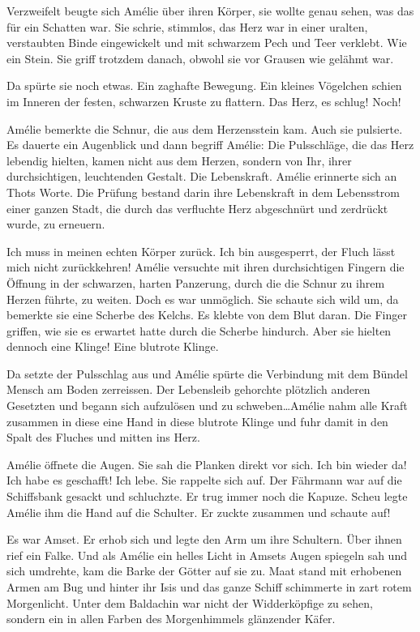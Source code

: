 \documentclass[11pt,titlepage,a5paper]{book}
\begin{document}
Verzweifelt beugte sich Amélie über ihren Körper, sie wollte genau sehen, was das für ein Schatten war. Sie schrie, stimmlos, das Herz war in einer uralten, verstaubten Binde eingewickelt und mit schwarzem Pech und Teer verklebt. Wie ein Stein. Sie griff trotzdem danach, obwohl sie vor Grausen wie gelähmt war. 

Da spürte sie noch etwas. Ein zaghafte Bewegung. Ein kleines Vögelchen schien  im Inneren der festen, schwarzen Kruste zu flattern. Das Herz, es schlug! Noch!

Amélie bemerkte die Schnur, die aus dem Herzensstein kam. Auch sie pulsierte. Es dauerte ein Augenblick und dann begriff Amélie: Die Pulsschläge, die das Herz lebendig hielten, kamen nicht aus dem Herzen, sondern von Ihr, ihrer durchsichtigen, leuchtenden Gestalt. Die Lebenskraft.  Amélie erinnerte sich an Thots Worte. Die Prüfung bestand darin ihre Lebenskraft in dem Lebensstrom einer ganzen Stadt, die durch das verfluchte Herz abgeschnürt und zerdrückt wurde, zu erneuern.

Ich muss in meinen echten Körper zurück. Ich bin ausgesperrt, der Fluch lässt mich nicht zurückkehren! Amélie versuchte mit ihren durchsichtigen Fingern die Öffnung in der schwarzen, harten Panzerung, durch die die Schnur zu ihrem Herzen führte, zu weiten. Doch es war unmöglich. Sie schaute sich wild um, da bemerkte sie eine Scherbe des Kelchs. Es klebte von dem Blut daran. Die Finger griffen, wie sie es erwartet hatte durch die Scherbe hindurch. Aber sie hielten dennoch eine Klinge! Eine blutrote Klinge. 

Da setzte der Pulsschlag aus und Amélie spürte die Verbindung mit dem Bündel Mensch am Boden zerreissen. Der Lebensleib gehorchte plötzlich anderen Gesetzten und begann sich aufzulösen und zu schweben\dots Amélie nahm alle Kraft zusammen in diese eine Hand in diese blutrote Klinge und fuhr damit in den Spalt des Fluches und mitten ins Herz.

Amélie öffnete die Augen. Sie sah die Planken direkt vor sich. Ich bin wieder da! Ich habe es geschafft! Ich lebe. Sie rappelte sich auf. Der Fährmann war auf die Schiffsbank gesackt und schluchzte. Er trug immer noch die Kapuze. Scheu legte Amélie ihm die Hand auf die Schulter. Er zuckte zusammen und schaute auf! 

Es war Amset. Er erhob sich und legte den Arm um ihre Schultern. Über ihnen rief ein Falke. Und als Amélie ein helles Licht in Amsets Augen spiegeln sah und sich umdrehte, kam die Barke der Götter auf sie zu. Maat stand mit erhobenen Armen am Bug und hinter ihr Isis und das ganze Schiff schimmerte in zart rotem Morgenlicht. Unter dem Baldachin war nicht der Widderköpfige zu sehen, sondern ein in allen Farben des Morgenhimmels glänzender Käfer.
\end{document}
